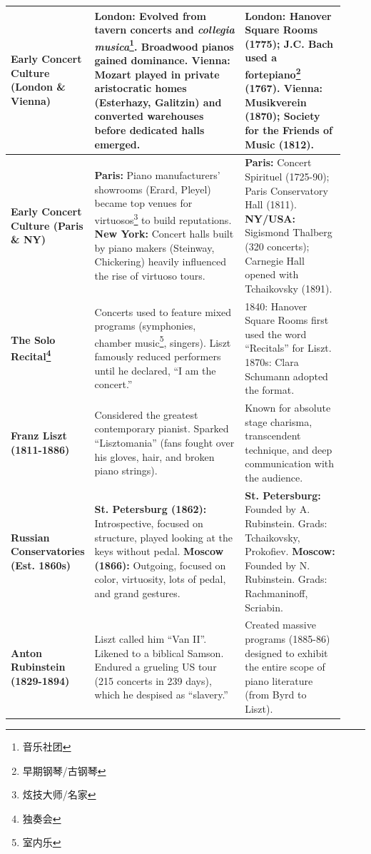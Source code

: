 \documentclass[math,code]{amznotes}
\theoremstyle{remark}
\begin{document}
\begin{longtable}{|p{0.18\linewidth}|p{0.45\linewidth}|p{0.3\linewidth}|}
\textbf{Early Concert Culture (London \& Vienna)} & \textbf{London:} Evolved from tavern concerts and \textit{collegia musica}\footnote{音乐社团}. Broadwood pianos gained dominance. \newline \textbf{Vienna:} Mozart played in private aristocratic homes (Esterhazy, Galitzin) and converted warehouses before dedicated halls emerged. & \textbf{London:} Hanover Square Rooms (1775); J.C. Bach used a fortepiano\footnote{早期钢琴/古钢琴} (1767). \newline \textbf{Vienna:} Musikverein (1870); Society for the Friends of Music (1812). \\
\hline
\textbf{Early Concert Culture (Paris \& NY)} & \textbf{Paris:} Piano manufacturers' showrooms (Erard, Pleyel) became top venues for virtuosos\footnote{炫技大师/名家} to build reputations. \newline \textbf{New York:} Concert halls built by piano makers (Steinway, Chickering) heavily influenced the rise of virtuoso tours. & \textbf{Paris:} Concert Spirituel (1725-90); Paris Conservatory Hall (1811). \newline \textbf{NY/USA:} Sigismond Thalberg (320 concerts); Carnegie Hall opened with Tchaikovsky (1891). \\
\hline
\textbf{The Solo Recital\footnote{独奏会}} & Concerts used to feature mixed programs (symphonies, chamber music\footnote{室内乐}, singers). Liszt famously reduced performers until he declared, ``I am the concert.'' & 1840: Hanover Square Rooms first used the word ``Recitals'' for Liszt. 1870s: Clara Schumann adopted the format. \\
\hline
\textbf{Franz Liszt (1811-1886)} & Considered the greatest contemporary pianist. Sparked ``Lisztomania'' (fans fought over his gloves, hair, and broken piano strings). & Known for absolute stage charisma, transcendent technique, and deep communication with the audience. \\
\hline
\textbf{Russian Conservatories (Est. 1860s)} & \textbf{St. Petersburg (1862):} Introspective, focused on structure, played looking at the keys without pedal. \newline \textbf{Moscow (1866):} Outgoing, focused on color, virtuosity, lots of pedal, and grand gestures. & \textbf{St. Petersburg:} Founded by A. Rubinstein. Grads: Tchaikovsky, Prokofiev. \newline \textbf{Moscow:} Founded by N. Rubinstein. Grads: Rachmaninoff, Scriabin. \\
\hline
\textbf{Anton Rubinstein (1829-1894)} & Liszt called him ``Van II''. Likened to a biblical Samson. Endured a grueling US tour (215 concerts in 239 days), which he despised as ``slavery.'' & Created massive programs (1885-86) designed to exhibit the entire scope of piano literature (from Byrd to Liszt). \\

\end{longtable}
\end{document}
